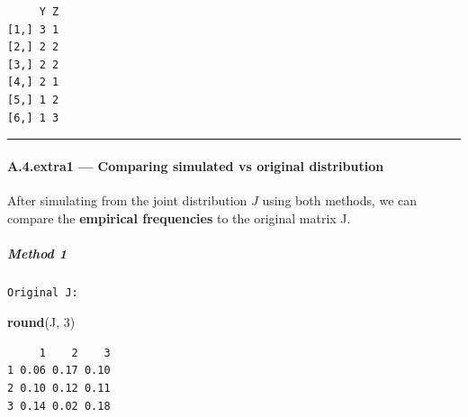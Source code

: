 \documentclass[
]{article}
\newenvironment{Shaded}{\begin{snugshade}}{\end{snugshade}}
\newcommand{\CommentTok}[1]{\textcolor[rgb]{0.56,0.35,0.01}{\textit{#1}}}
\newcommand{\DecValTok}[1]{\textcolor[rgb]{0.00,0.00,0.81}{#1}}
\newcommand{\FunctionTok}[1]{\textcolor[rgb]{0.13,0.29,0.53}{\textbf{#1}}}
\newcommand{\NormalTok}[1]{#1}
\newcommand{\OtherTok}[1]{\textcolor[rgb]{0.56,0.35,0.01}{#1}}
\newcommand{\SpecialCharTok}[1]{\textcolor[rgb]{0.81,0.36,0.00}{\textbf{#1}}}
\newcommand{\StringTok}[1]{\textcolor[rgb]{0.31,0.60,0.02}{#1}}
\begin{document}
\begin{verbatim}
     Y Z
[1,] 3 1
[2,] 2 2
[3,] 2 2
[4,] 2 1
[5,] 1 2
[6,] 1 3
\end{verbatim}

\begin{center}\rule{0.5\linewidth}{0.5pt}\end{center}

\paragraph{A.4.extra1 --- Comparing simulated vs original
distribution}\label{a.4.extra1-comparing-simulated-vs-original-distribution}

After simulating from the joint distribution \(J\) using both methods,
we can compare the \textbf{empirical frequencies} to the original matrix
J.

\subparagraph{Method 1}\label{method-1}

\begin{Shaded}
\end{Shaded}

\begin{verbatim}
Original J:
\end{verbatim}

\begin{Shaded}
\begin{Highlighting}[]
\FunctionTok{round}\NormalTok{(J, }\DecValTok{3}\NormalTok{)}
\end{Highlighting}
\end{Shaded}

\begin{verbatim}
     1    2    3
1 0.06 0.17 0.10
2 0.10 0.12 0.11
3 0.14 0.02 0.18
\end{verbatim}
\end{document}
